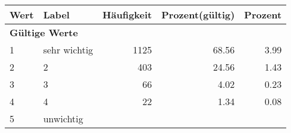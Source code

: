      \begin{longtable}{lXrrr}
     \toprule
     \textbf{Wert} & \textbf{Label} & \textbf{Häufigkeit} & \textbf{Prozent(gültig)} & \textbf{Prozent} \\
     \endhead
     \midrule
     \multicolumn{5}{l}{\textbf{Gültige Werte}}\\

     1 &
     \multicolumn{1}{X}{ sehr wichtig   } &


       \num{1125} &
       \num[round-mode=places,round-precision=2]{68,56} &
         \num[round-mode=places,round-precision=2]{3,99} \\

     2 &
     \multicolumn{1}{X}{ 2   } &


       \num{403} &
       \num[round-mode=places,round-precision=2]{24,56} &
         \num[round-mode=places,round-precision=2]{1,43} \\

     3 &
     \multicolumn{1}{X}{ 3   } &


       \num{66} &
       \num[round-mode=places,round-precision=2]{4,02} &
         \num[round-mode=places,round-precision=2]{0,23} \\

     4 &
     \multicolumn{1}{X}{ 4   } &


       \num{22} &
       \num[round-mode=places,round-precision=2]{1,34} &
         \num[round-mode=places,round-precision=2]{0,08} \\

     5 &
     \multicolumn{1}{X}{ unwichtig   } &



\end{longtable}
